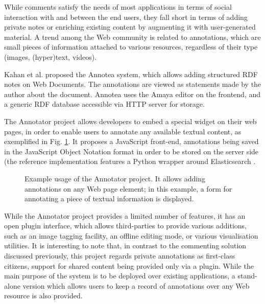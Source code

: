 While comments satisfy the needs of most applications in terms of social
interaction with and between the end users, they fall short in terms of adding
private notes or enriching existing content by augmenting it with
user-generated material. A trend among the Web community is related to
annotations, which are small pieces of information attached to various
resources, regardless of their type (images, (hyper)text, videos).

Kahan et al.\cite{ref:annotea} proposed the Annotea system, which allows adding
structured RDF notes on Web Documents. The annotations are viewed as statements
made by the author about the document. Annotea uses the Amaya \cite{ref:amaya}
editor on the frontend, and a generic RDF database accessible via HTTP server
for storage.

The Annotator project \cite{ref:annotator} allows developers to embed a special
widget on their web pages, in order to enable users to annotate any available
textual content, as exemplified in Fig. \ref{fig:annotator}.  It proposes a
JavaScript front-end, annotations being saved in the JavaScript Object Notation
format in order to be stored on the server side (the reference implementation
features a Python wrapper around Elasticsearch \cite{ref:elasearch}.

\begin{figure}[!h]
  \centering
  \caption[Example usage of the Annotator project]
          {Example usage of the Annotator project. It allows
           adding annotations on any Web page element; in this example, a form
           for annotating a piece of textual information is displayed.}
  \label{fig:annotator}
\end{figure}

While the Annotator project provides a limited number of features, it has an
open plugin interface, which allows third-parties to provide various additions,
such as an image tagging facility, an offline editing mode, or various
visualisation utilities. It is interesting to note that, in contrast to the
commenting solution discussed previously, this project regards private
annotations as first-class citizens, support for shared content being provided
only via a plugin. While the main purpose of the system is to be deployed over
existing applications, a stand-alone version which allows users to keep a
record of annotations over any Web resource is also provided.

